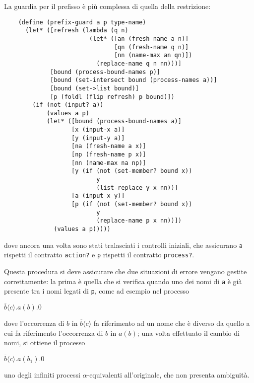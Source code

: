 La guardia per il prefisso \`e pi\`u complessa di quella della
restrizione:

\begin{lstlisting}
    (define (prefix-guard a p type-name)
      (let* ([refresh (lambda (q n)
                        (let* ([an (fresh-name a n)]
                               [qn (fresh-name q n)]
                               [nn (name-max an qn)])
                          (replace-name q n nn)))]
             [bound (process-bound-names p)]
             [bound (set-intersect bound (process-names a))]
             [bound (set->list bound)]
             [p (foldl (flip refresh) p bound)])
        (if (not (input? a))
            (values a p)
            (let* ([bound (process-bound-names a)]
                   [x (input-x a)]
                   [y (input-y a)]
                   [na (fresh-name a x)]
                   [np (fresh-name p x)]
                   [nn (name-max na np)]
                   [y (if (not (set-member? bound x))
                          y
                          (list-replace y x nn))]
                   [a (input x y)]
                   [p (if (not (set-member? bound x))
                          y
                          (replace-name p x nn))])
              (values a p)))))
\end{lstlisting}

dove ancora una volta sono stati tralasciati i controlli iniziali, che
assicurano \lstinline{a} rispetti il contratto \lstinline{action?} e
\lstinline{p} rispetti il contratto \lstinline{process?}.

Questa procedura si deve assicurare che due situazioni di errore vengano
gestite correttamente: la prima \`e quella che si verifica quando uno dei
nomi di \lstinline{a} \`e gi\`a presente tra i nomi legati di
\lstinline{p}, come ad esempio nel processo

\begin{pilisting}
$
    \overline{b}\langle c\rangle.a(b).0
$
\end{pilisting}

dove l'occorrenza di $b$ in $\overline{b}\langle c\rangle$ fa riferimento
ad un nome che \`e diverso da quello a cui fa riferimento l'occorrenza di
$b$ in $a(b)$; una volta effettuato il cambio di nomi, si ottiene il
processo

\begin{pilisting}
$
    \overline{b}\langle c\rangle.a(b_1).0
$
\end{pilisting}

uno degli infiniti processi $\alpha$-equivalenti all'originale, che non
presenta ambiguit\`a.

